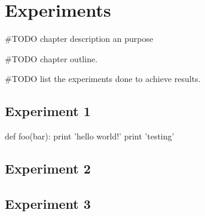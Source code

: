 \chapter{Experiments}\label{experiments}
#TODO chapter description an purpose

#TODO chapter outline. 

#TODO list the experiments done to achieve results. 
\section{Experiment 1}

\begin{python}
def foo(bar):
    print 'hello world!'
	print 'testing'
\end{python}


\section{Experiment 2}

\section{Experiment 3}

